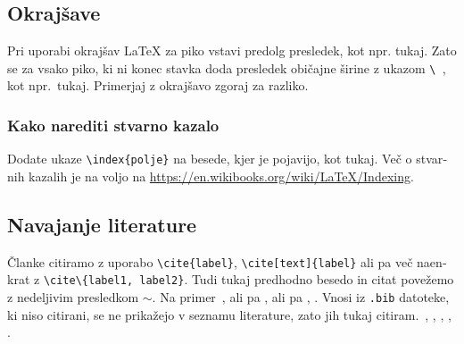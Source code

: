 \documentclass[12pt,a4paper,twoside]{article}
\theoremstyle{definition} %
\theoremstyle{plain} %
\numberwithin{equation}{section}  %
\begin{document}
\begin{otherlanguage}{slovene}
\subsection{Okrajšave}
Pri uporabi okrajšav \LaTeX{} za piko vstavi predolg presledek, kot npr. tukaj. Zato se za vsako
piko, ki ni konec stavka doda presledek običajne širine z ukazom \verb*|\ |, kot npr.\ tukaj.
Primerjaj z okrajšavo zgoraj za razliko.

\subsubsection{Kako narediti stvarno kazalo}
Dodate ukaze \verb|\index{polje}| na besede, kjer je pojavijo, kot tukaj.
Več o stvarnih kazalih je na voljo na \url{https://en.wikibooks.org/wiki/LaTeX/Indexing}.

\subsection{Navajanje literature}
Članke citiramo z uporabo \verb|\cite{label}|, \verb|\cite[text]{label}| ali pa več naenkrat z
\verb|\cite\{label1, label2}|. Tudi tukaj predhodno besedo in citat povežemo z nedeljivim presledkom
$\sim$. Na primer~\cite{chen2006meshless,liu2001point}, ali pa \cite{kibriya2007empirical}, ali pa
\cite[str.\ 12]{trobec2015parallel}, \cite[enačba (2.3)]{pereira2016convergence}.
Vnosi iz \verb|.bib| datoteke, ki niso citirani, se ne prikažejo v seznamu literature, zato jih
tukaj citiram.~\cite{vene2000categorical}, \cite{gregoric2017stopniceni}, \cite{slak2015induktivni}, \cite{nsphere}, \cite{kearsley1975linearly}.

\end{otherlanguage}

\cleardoublepage                           %

\printindex
\end{document}
